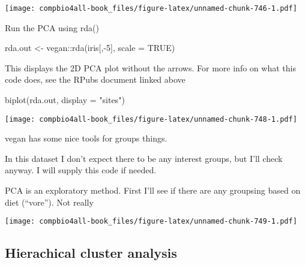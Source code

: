 \documentclass[
]{book}
\newenvironment{Shaded}{\begin{snugshade}}{\end{snugshade}}
\newcommand{\AttributeTok}[1]{\textcolor[rgb]{0.77,0.63,0.00}{#1}}
\newcommand{\ConstantTok}[1]{\textcolor[rgb]{0.00,0.00,0.00}{#1}}
\newcommand{\DecValTok}[1]{\textcolor[rgb]{0.00,0.00,0.81}{#1}}
\newcommand{\FunctionTok}[1]{\textcolor[rgb]{0.00,0.00,0.00}{#1}}
\newcommand{\NormalTok}[1]{#1}
\newcommand{\OtherTok}[1]{\textcolor[rgb]{0.56,0.35,0.01}{#1}}
\newcommand{\SpecialCharTok}[1]{\textcolor[rgb]{0.00,0.00,0.00}{#1}}
\newcommand{\StringTok}[1]{\textcolor[rgb]{0.31,0.60,0.02}{#1}}
\begin{document}
\texttt{[image: compbio4all-book\_files/figure-latex/unnamed-chunk-746-1.pdf]}

Run the PCA using rda()

\begin{Shaded}
\begin{Highlighting}[]
\NormalTok{rda.out }\OtherTok{\textless{}{-}}\NormalTok{ vegan}\SpecialCharTok{::}\FunctionTok{rda}\NormalTok{(iris[,}\SpecialCharTok{{-}}\DecValTok{5}\NormalTok{], }\AttributeTok{scale =} \ConstantTok{TRUE}\NormalTok{)}
\end{Highlighting}
\end{Shaded}

This displays the 2D PCA plot without the arrows. For more info on what this code does, see the RPubs document linked above

\begin{Shaded}
\begin{Highlighting}[]
\FunctionTok{biplot}\NormalTok{(rda.out, }\AttributeTok{display =} \StringTok{"sites"}\NormalTok{)}
\end{Highlighting}
\end{Shaded}

\texttt{[image: compbio4all-book\_files/figure-latex/unnamed-chunk-748-1.pdf]}

vegan has some nice tools for groups things.

In this dataset I don't expect there to be any interest groups, but I'll check anyway.
I will supply this code if needed.

PCA is an exploratory method. First I'll see if there are any groupsing based on diet (``vore''). Not really

\begin{Shaded}
\end{Shaded}

\texttt{[image: compbio4all-book\_files/figure-latex/unnamed-chunk-749-1.pdf]}

\hypertarget{hierachical-cluster-analysis}{%
\subsection{Hierachical cluster analysis}\label{hierachical-cluster-analysis}}
\end{document}
